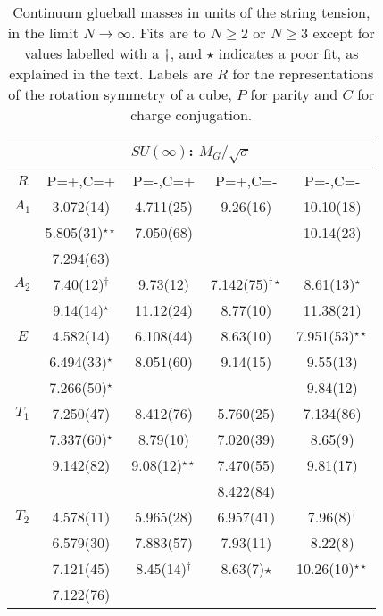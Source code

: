 \documentclass[12pt]{article}
\begin{document}
\clearpage

\begin{table}[htb]
\centering
\begin{tabular}{|c|c|c|c|c|} \hline
\multicolumn{5}{|c|}{$SU(\infty)$:  $M_G/\surd\sigma$ } \\ \hline
  $R$   & P=+,C=+ & P=-,C=+ &  P=+,C=-   &  P=-,C=-   \\ \hline
$A_1$  & 3.072(14)         & 4.711(25)            & 9.26(16)        &  10.10(18) \\
    & 5.805(31)$^{\star\star}$ & 7.050(68)             &                &  10.14(23) \\
    & 7.294(63)         &                       &                &   \\ \hline
$A_2$  & 7.40(12)$^\dagger$ & 9.73(12)              & 7.142(75)$^{\dagger\star}$  & 8.61(13)$^\star$ \\
    & 9.14(14)$^\star$   & 11.12(24)             & 8.77(10)      &  11.38(21)   \\ \hline
$E$   & 4.582(14)         & 6.108(44)             & 8.63(10)      &  7.951(53)$^{\star\star}$ \\
    & 6.494(33)$^\star$  & 8.051(60)             & 9.14(15)      &  9.55(13)                   \\
    & 7.266(50)$^\star$  &                       &               &  9.84(12)                 \\ \hline
$T_1$  & 7.250(47)         & 8.412(76)             & 5.760(25)     & 7.134(86)  \\
    & 7.337(60)$^\star$  & 8.79(10)              & 7.020(39)     & 8.65(9)  \\
    & 9.142(82)         & 9.08(12)$^{\star\star}$ & 7.470(55)     & 9.81(17)  \\ 
    &                   &                       & 8.422(84)     &             \\ \hline
$T_2$  & 4.578(11)         & 5.965(28)             & 6.957(41)     &  7.96(8)$^\dagger$ \\
    & 6.579(30)         & 7.883(57)             & 7.93(11)      &  8.22(8)            \\
    & 7.121(45)         & 8.45(14)$^\dagger$     & 8.63(7)$\star$ & 10.26(10)$^{\star\star}$  \\
    & 7.122(76)         &     &     &  \\ \hline
\end{tabular}
\caption{Continuum glueball masses in units of the string tension,
  in the limit $N\to\infty$. Fits are to $N\geq 2$ or $N\geq 3$ except
  for values labelled with a $\dagger$, and $\star$ indicates a  poor fit,
  as explained in the text. 
  Labels are $R$ for the representations of the rotation symmetry of a cube,
  $P$ for parity and  $C$ for charge conjugation.}
\label{table_MK_R_SUN}
\end{table}
\end{document}
